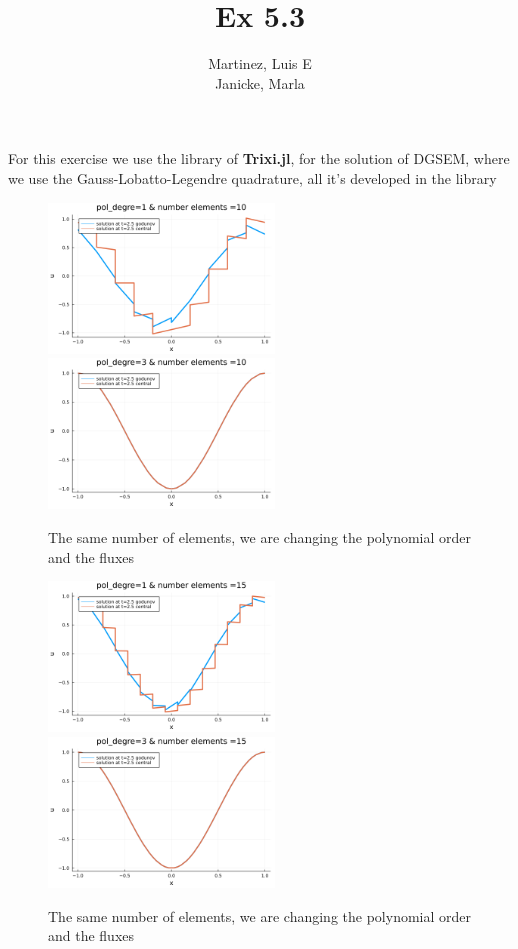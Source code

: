 \documentclass{article}
\author{Martinez, Luis E\\
		Janicke, Marla}
\title{Ex 5.3}
\begin{document}
\maketitle
	For this exercise we use the library of \textbf{Trixi.jl}, for the solution of DGSEM, where we use the Gauss-Lobatto-Legendre quadrature, all it's developed in the library
	\begin{figure}
		\centering
		\includegraphics[width=6cm]{1,10}
		\includegraphics[width=6cm]{3,10}
		\caption{The same number of elements, we are changing the polynomial order and the fluxes}
	\end{figure}
	\begin{figure}
		\centering
		\includegraphics[width=6cm]{1,15}
		\includegraphics[width=6cm]{3,15}
		\caption{The same number of elements, we are changing the polynomial order and the fluxes}
	\end{figure}
\end{document}
